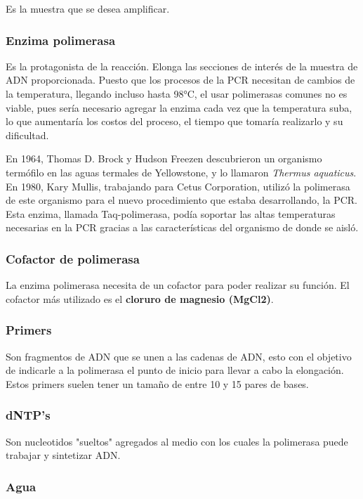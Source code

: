 Es la muestra que se desea amplificar.

\subsubsection{Enzima polimerasa}

Es la protagonista de la reacción. Elonga las secciones de interés de la muestra de ADN proporcionada. Puesto que los procesos de la PCR necesitan de cambios de la temperatura, llegando incluso hasta 98°C, el usar polimerasas comunes no es viable, pues sería necesario agregar la enzima cada vez que la temperatura suba, lo que aumentaría los costos del proceso, el tiempo que tomaría realizarlo y su dificultad.

En 1964, Thomas D. Brock y Hudson Freezen descubrieron un organismo termófilo en las aguas termales de Yellowstone, y lo llamaron \textit{Thermus aquaticus}. En 1980, Kary Mullis, trabajando para Cetus Corporation, utilizó la polimerasa de este organismo para el nuevo procedimiento que estaba desarrollando, la PCR. Esta enzima, llamada Taq-polimerasa, podía soportar las altas temperaturas necesarias en la PCR gracias a las características del organismo de donde se aisló.

\subsubsection{Cofactor de polimerasa}

La enzima polimerasa necesita de un cofactor para poder realizar su función. El cofactor más utilizado es el \textbf{cloruro de magnesio (MgCl2)}.

\subsubsection{Primers}

Son fragmentos de ADN que se unen a las cadenas de ADN, esto con el objetivo de indicarle a la polimerasa el punto de inicio para llevar a cabo la elongación.
Estos primers suelen tener un tamaño de entre 10 y 15 pares de bases.

\subsubsection{dNTP's}

Son nucleotidos "sueltos" agregados al medio con los cuales la polimerasa puede trabajar y sintetizar ADN.

\subsubsection{Agua}

